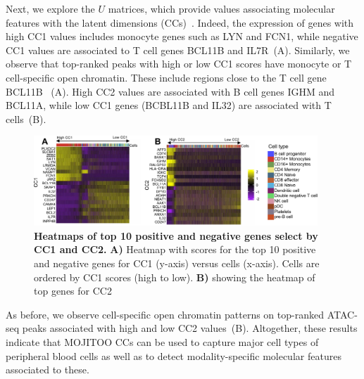 Next, we explore the $U$ matrices, which provide values associating molecular features with the latent dimensions (CCs)~. Indeed, the expression of genes with high CC1 values includes monocyte genes such as LYN and FCN1, while negative CC1 values are associated to T cell genes BCL11B and IL7R~(A). Similarly, we observe that top-ranked peaks with high or low CC1 scores have monocyte or T cell-specific open chromatin. These include regions close to the T cell gene BCL11B ~(A). High CC2 values are associated with B cell genes IGHM and BCL11A, while low CC1 genes (BCBL11B and IL32) are associated with T cells~(B). 

\begin{figure}[!h]
	\centering
	\includegraphics[width=0.95\textwidth]{CC_Genes/fig}
	\vspace{0.1cm}
	\caption[Heatmaps of top 10 positive and negative genes select by CC1 and CC2.]{\textbf{Heatmaps of top 10 positive and negative genes select by CC1 and CC2.} \textbf{A)} Heatmap with scores for the top 10 positive and negative genes for CC1 (y-axis) versus cells (x-axis). Cells are ordered by CC1 scores (high to low). \textbf{B)} showing the heatmap of top genes for CC2}
	\label{fig:CC_Genes}
\end{figure}

As before, we observe cell-specific open chromatin patterns on top-ranked ATAC-seq peaks associated with high and low CC2 values~(B). Altogether, these results indicate that MOJITOO CCs can be used to capture major cell types of peripheral blood cells as well as to detect modality-specific molecular features associated to these.

